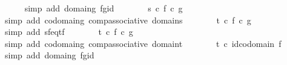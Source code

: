 \begin{isabellebody}
\ \ \ \ \isamarkupfalse%
\ {\isacharparenleft}{\kern0pt}simp\ add{\isacharcolon}{\kern0pt}\ domain{\isacharunderscore}{\kern0pt}g\ fg{\isacharunderscore}{\kern0pt}id{\isacharparenright}{\kern0pt}\isanewline
\ \ \isamarkupfalse%
\ \isamarkupfalse%
\ {\isachardoublequoteopen}{\isachardot}{\kern0pt}{\isachardot}{\kern0pt}{\isachardot}{\kern0pt}\ {\isacharequal}{\kern0pt}\ {\isacharparenleft}{\kern0pt}s\ {\isasymcirc}\isactrlsub c\ f{\isacharparenright}{\kern0pt}\ {\isasymcirc}\isactrlsub c\ g{\isachardoublequoteclose}\isanewline
\ \ \ \ \isamarkupfalse%
\ {\isacharparenleft}{\kern0pt}simp\ add{\isacharcolon}{\kern0pt}\ codomain{\isacharunderscore}{\kern0pt}g\ comp{\isacharunderscore}{\kern0pt}associative\ domain{\isacharunderscore}{\kern0pt}s{\isacharparenright}{\kern0pt}\isanewline
\ \ \isamarkupfalse%
\ \isamarkupfalse%
\ {\isachardoublequoteopen}{\isachardot}{\kern0pt}{\isachardot}{\kern0pt}{\isachardot}{\kern0pt}\ {\isacharequal}{\kern0pt}\ {\isacharparenleft}{\kern0pt}t\ {\isasymcirc}\isactrlsub c\ f{\isacharparenright}{\kern0pt}\ {\isasymcirc}\isactrlsub c\ g{\isachardoublequoteclose}\isanewline
\ \ \ \ \isamarkupfalse%
\ {\isacharparenleft}{\kern0pt}simp\ add{\isacharcolon}{\kern0pt}\ sf{\isacharunderscore}{\kern0pt}eq{\isacharunderscore}{\kern0pt}tf{\isacharparenright}{\kern0pt}\isanewline
\ \ \isamarkupfalse%
\ \isamarkupfalse%
\ {\isachardoublequoteopen}{\isachardot}{\kern0pt}{\isachardot}{\kern0pt}{\isachardot}{\kern0pt}\ {\isacharequal}{\kern0pt}\ t\ {\isasymcirc}\isactrlsub c\ {\isacharparenleft}{\kern0pt}f\ {\isasymcirc}\isactrlsub c\ g{\isacharparenright}{\kern0pt}{\isachardoublequoteclose}\isanewline
\ \ \ \ \isamarkupfalse%
\ {\isacharparenleft}{\kern0pt}simp\ add{\isacharcolon}{\kern0pt}\ codomain{\isacharunderscore}{\kern0pt}g\ comp{\isacharunderscore}{\kern0pt}associative\ domain{\isacharunderscore}{\kern0pt}t{\isacharparenright}{\kern0pt}\isanewline
\ \ \isamarkupfalse%
\ \isamarkupfalse%
\ {\isachardoublequoteopen}{\isachardot}{\kern0pt}{\isachardot}{\kern0pt}{\isachardot}{\kern0pt}\ {\isacharequal}{\kern0pt}\ t\ {\isasymcirc}\isactrlsub c\ id{\isacharparenleft}{\kern0pt}codomain\ f{\isacharparenright}{\kern0pt}{\isachardoublequoteclose}\isanewline
\ \ \ \ \isamarkupfalse%
\ {\isacharparenleft}{\kern0pt}simp\ add{\isacharcolon}{\kern0pt}\ domain{\isacharunderscore}{\kern0pt}g\ fg{\isacharunderscore}{\kern0pt}id{\isacharparenright}{\kern0pt}\isanewline

\end{isabellebody}
